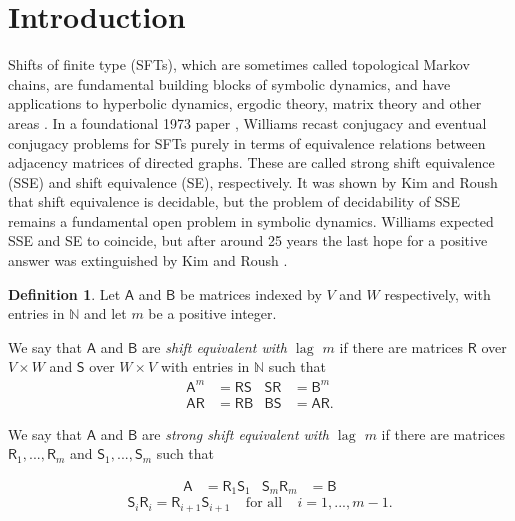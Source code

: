 \documentclass[11pt, letterpaper,final]{amsart}
\newcommand{\bbN}{{\mathbb{N}}}
\newcommand{\lag}{\operatorname{lag}}
\theoremstyle{definition}
\newtheorem{dfn}[thm]{Definition}
\begin{document}
        
\maketitle


\section{Introduction}

Shifts of finite type (SFTs), which are sometimes called topological Markov chains, are fundamental building blocks of symbolic dynamics, and have applications to hyperbolic dynamics, ergodic theory, matrix theory and other areas \cite{RB75, DGS76}.  In a foundational 1973 paper \cite{Wil73}, Williams recast conjugacy and eventual conjugacy problems for SFTs purely in terms of equivalence relations between adjacency matrices of directed graphs. These are called strong shift equivalence (SSE) and shift equivalence (SE), respectively. It was shown by Kim and Roush \cite{KRdeci, KRdecii} that shift equivalence is decidable, but the problem of decidability of SSE remains a fundamental open problem in symbolic dynamics. Williams expected SSE and SE to coincide, but after around 25 years the last hope for a positive answer was extinguished by Kim and Roush \cite{KR99}.

\begin{dfn}
Let $\mathsf{A}$ and $\mathsf{B}$ be matrices indexed by $V$ and $W$ respectively, with entries in $\bbN$ and let $m$ be a positive integer.  

We say that $\mathsf{A}$ and $\mathsf{B}$ are \emph{shift equivalent with $\lag$ $m$} if there are matrices $\mathsf{R}$ over $V \times W$ and $\mathsf{S}$ over $W\times V$ with entries in $\bbN$ such that 
\begin{align*}
\mathsf{A}^m &= \mathsf{R}\mathsf{S}  & \mathsf{S}\mathsf{R} &= \mathsf{B}^m \\
\mathsf{A}\mathsf{R} &=\mathsf{R}\mathsf{B} & \mathsf{B}\mathsf{S} &= \mathsf{A}\mathsf{R}.
\end{align*}

We say that $\mathsf{A}$ and $\mathsf{B}$ are \emph{strong shift equivalent with $\lag$ $m$} if there are matrices $\mathsf{R}_1,..., \mathsf{R}_m$ and $\mathsf{S}_1,...,\mathsf{S}_m$ such that

\begin{align*}
\mathsf{A} &= \mathsf{R}_1\mathsf{S}_1 & \mathsf{S}_m\mathsf{R}_m &= \mathsf{B} 
\end{align*}
$$
\mathsf{S}_i \mathsf{R}_i = \mathsf{R}_{i+1} \mathsf{S}_{i+1} \ \ \ \ \ \text{for all} \ \ \ \ \  i=1,...,m-1.
$$
\end{dfn}
\end{document}
